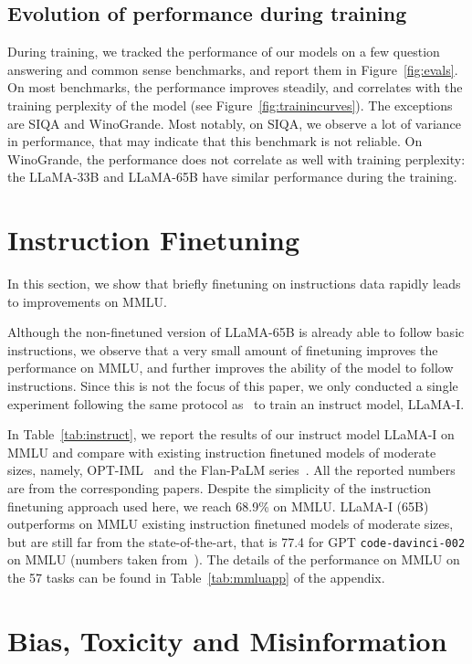 \subsection{Evolution of performance during training}

 During training, we tracked the performance of our models on a few question answering and common sense benchmarks, and report them in Figure~\ref{fig:evals}.
On most benchmarks, the performance improves steadily, and correlates with the training perplexity of the model (see Figure~\ref{fig:trainincurves}). 
The exceptions are SIQA and WinoGrande. Most notably, on SIQA, we observe a lot of variance in performance, that may indicate that this benchmark is not reliable. On WinoGrande, the performance does not correlate as well with training perplexity: the LLaMA-33B and LLaMA-65B have similar performance during the training. 

\section{Instruction Finetuning}
\label{sec:instruct}

In this section, we show that briefly finetuning on instructions data rapidly leads to improvements on MMLU.

Although the non-finetuned version of LLaMA-65B is already able to follow basic instructions, we observe that a very small amount of finetuning improves the performance on MMLU, and further improves the ability of the model to follow instructions. Since this is not the focus of this paper, we only conducted a single experiment following the same protocol as~\citet{Chung2022ScalingIL} to train an instruct model, LLaMA-I.

In Table~\ref{tab:instruct}, we report the results of our instruct model LLaMA-I on MMLU and compare with existing instruction finetuned models of moderate sizes, namely, OPT-IML~\cite{iyer2022opt} and the Flan-PaLM series~\cite{Chung2022ScalingIL}. All the reported numbers are from the corresponding papers. Despite the simplicity of the instruction finetuning approach used here, we reach 68.9\% on MMLU. LLaMA-I (65B) outperforms on MMLU existing instruction finetuned models of moderate sizes, but are still far from the state-of-the-art, that is 77.4 for GPT \texttt{code-davinci-002} on MMLU (numbers taken from~\citet{iyer2022opt}).
The details of the performance on MMLU on the 57 tasks can be found in Table~\ref{tab:mmluapp} of the appendix.

\section{Bias, Toxicity and Misinformation}

